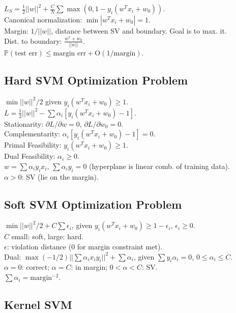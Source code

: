 $L_S = \frac{1}{2}||w||^2 + \frac{C}{N} \sum \max(0, 1-y_i(w^T x_i + w_0))$.\\
Canonical normalization: $\min |w^T x_i + w_0| = 1$.\\
Margin: $1/||w||$, distance between SV and boundary. Goal is to max. it.\\
Dist. to boundary: $\frac{w^x + w_0}{||w||}$.\\
$\mathbb{P}(\text{test err}) \leq \text{margin err} + \text{O}(1/\text{margin})$.

\subsection*{Hard SVM Optimization Problem}

$\min ||w||^2/2$ given $y_i(w^T x_i + w_0) \geq 1$.\\
$L = \frac{1}{2} ||w||^2 - \sum \alpha_i [y_i(w^T x_i + w_0) - 1]$.\\
Stationarity: ${\partial L}/{\partial w}=0$, ${\partial L}/{\partial w_0} = 0$.\\
Complementarity: $\alpha_i [y_i (w^T x_i + w_0) - 1] = 0$.\\
Primal Feasibility: $y_i (w^T x_i + w_0) \geq 1$.\\
Dual Feasibility: $\alpha_i \geq 0$.\\
$w = \sum \alpha_i y_i x_i$, $\sum \alpha_i y_i = 0$ (hyperplane is linear comb. of training data).\\
$\alpha > 0$: SV (lie on the margin).

\subsection*{Soft SVM Optimization Problem}

$\min ||w||^2/2 + C \sum \epsilon_i$, given $y_i(w^T x_i + w_0) \geq 1 - \epsilon_i$, $\epsilon_i \geq 0$.\\
$C$ small: soft, large: hard.\\
$\epsilon$: violation distance (0 for margin constraint met).\\
Dual: $\max (-1/2) ||\sum \alpha_i x_i y_i||^2 + \sum \alpha_i$, given $\sum y_i \alpha_i = 0$, $0 \leq \alpha_i \leq C$.\\
$\alpha=0$: correct; $\alpha=C$: in margin; $0 < \alpha < C$: SV.\\
$\sum \alpha_i = \text{margin}^{-2}$.

\subsection*{Kernel SVM}

